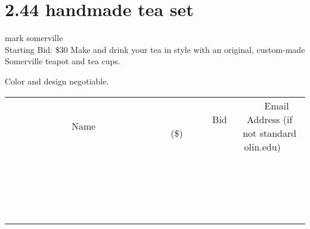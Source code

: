 \documentclass[11pt]{article}
\begin{document}
\section*{2.44 handmade tea set}
mark somerville
\\
Starting Bid: \$30
\newline
Make and drink your tea in style with an original, custom-made Somerville teapot and tea cups.  

Color and design negotiable.
\\[3ex]
\begin{tabular}{c c c}
~~~~~~~~~~~~~Name~~~~~~~~~~~~~ & ~~~~~~~~~Bid (\$)~~~~~~~~~  & ~~~Email Address (if not standard olin.edu)~~~\\
 & & \\
\hline
 & & \\
\hline
 & & \\
\hline
 & & \\
\hline
 & & \\
\hline
 & & \\
\hline
 & & \\
\hline
 & & \\
\hline
 & & \\
\hline
 & & \\
\hline
 & & \\
\hline
 & & \\
\hline
 & & \\
\hline
 & & \\
\hline
 & & \\
\hline
 & & \\
\hline
 & & \\
\hline
 & & \\
\hline
 & & \\
\hline
\end{tabular}
\newpage
\end{document}

